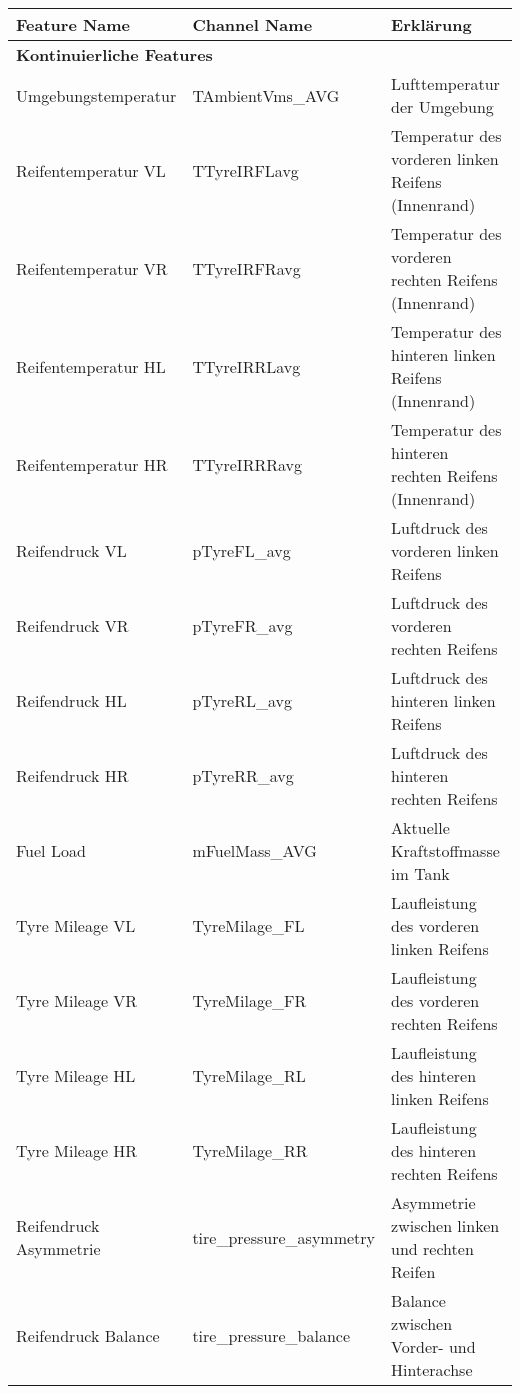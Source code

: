\begin{table}[H]
  \centering
  \footnotesize
  \begin{tabular}{|p{4.5cm}|p{3.5cm}|p{6cm}|}
    \hline
    \textbf{Feature Name} & \textbf{Channel Name} & \textbf{Erklärung} \\
    \hline
    \multicolumn{3}{|l|}{\textbf{Kontinuierliche Features}} \\
    \hline
    Umgebungstemperatur & TAmbientVms\_AVG & Lufttemperatur der Umgebung \\
    \hline
    Reifentemperatur VL & TTyreIRFLavg & Temperatur des vorderen linken Reifens (Innenrand) \\
    \hline
    Reifentemperatur VR & TTyreIRFRavg & Temperatur des vorderen rechten Reifens (Innenrand) \\
    \hline
    Reifentemperatur HL & TTyreIRRLavg & Temperatur des hinteren linken Reifens (Innenrand) \\
    \hline
    Reifentemperatur HR & TTyreIRRRavg & Temperatur des hinteren rechten Reifens (Innenrand) \\
    \hline
    Reifendruck VL & pTyreFL\_avg & Luftdruck des vorderen linken Reifens \\
    \hline
    Reifendruck VR & pTyreFR\_avg & Luftdruck des vorderen rechten Reifens \\
    \hline
    Reifendruck HL & pTyreRL\_avg & Luftdruck des hinteren linken Reifens \\
    \hline
    Reifendruck HR & pTyreRR\_avg & Luftdruck des hinteren rechten Reifens \\
    \hline
    Fuel Load & mFuelMass\_AVG & Aktuelle Kraftstoffmasse im Tank \\
    \hline
    Tyre Mileage VL & TyreMilage\_FL & Laufleistung des vorderen linken Reifens \\
    \hline
    Tyre Mileage VR & TyreMilage\_FR & Laufleistung des vorderen rechten Reifens \\
    \hline
    Tyre Mileage HL & TyreMilage\_RL & Laufleistung des hinteren linken Reifens \\
    \hline
    Tyre Mileage HR & TyreMilage\_RR & Laufleistung des hinteren rechten Reifens \\
    \hline
    Reifendruck Asymmetrie & tire\_pressure\_asymmetry & Asymmetrie zwischen linken und rechten Reifen \\
    \hline
    Reifendruck Balance & tire\_pressure\_balance & Balance zwischen Vorder- und Hinterachse \\

\end{tabular}
\end{table}
